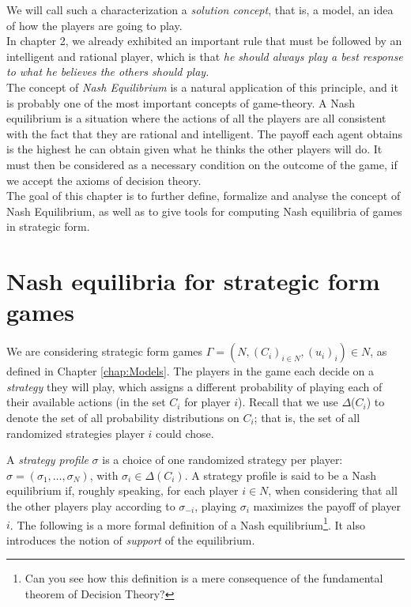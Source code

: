   We will call such a characterization a \emph{solution concept}, 
  that is,  
 a model, an idea of how the players are going to play.\\
In chapter 2, we already exhibited an important rule that must be followed by an intelligent and rational player, which is that \emph{he should always play a best response to what he believes the others should play.}\\
The concept of \emph{Nash Equilibrium} is a natural application of this principle, 
and it is probably one of the most important concepts of game-theory.
 A Nash equilibrium is a situation where the actions of all the players are all consistent with the fact that they are rational and intelligent.
  The payoff each agent obtains is the highest he can obtain given what he thinks the other players will do.  
  It must then be considered as a necessary condition on the outcome of the game, if we accept the axioms of decision theory. \\
The goal of this chapter is to further define, formalize and analyse the concept of Nash Equilibrium, as well as to give tools for computing Nash equilibria of games in strategic form.



\section{Nash equilibria for strategic form games}

We are considering 
strategic form games $\Gamma = (N,(C_i)_{i \in N}, (u_i)_i) \in N $, 
as defined in Chapter \ref{chap:Models}. 
The players in the game each decide on a \emph{strategy}
 they will play, which assigns a different probability 
 of playing each of their available actions 
 (in the set $C_i$ for player $i$). 
 Recall that we use $\Delta$($C_i$) to denote the set of all 
 probability distributions on $C_i$; that is,  the set 
 of all randomized strategies player $i$ could chose.

A \emph{strategy profile} $\sigma$ is a choice of one randomized strategy per player: $\sigma = (\sigma_1, \ldots, \sigma_N)$, with $\sigma_i \in \Delta(C_i)$. A strategy profile is said to be a Nash equilibrium if, roughly speaking, for each player $i \in N$,  when considering that all the other players play according to $\sigma_{-i}$, playing $\sigma_i$ maximizes the payoff of player $i$.
The following is a more formal definition of a Nash equilibrium\footnote{Can you see how this definition is a mere consequence of the fundamental theorem of Decision Theory?}. 
It also introduces the notion of \emph{support} of the equilibrium.

